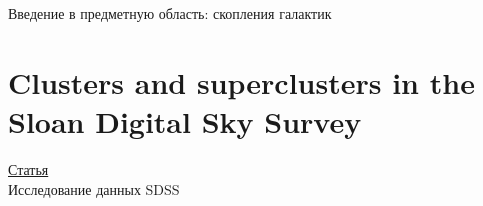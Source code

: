\documentclass{article}
\begin{document}
\begin{center}{\huge Введение в предметную область: скопления галактик\\}\end{center}

\section{Clusters and superclusters in the Sloan Digital Sky Survey}
\hyperlink{https://www.aanda.org/articles/aa/pdf/2003/26/aah4162.pdf}{Статья}\\

    Исследование данных SDSS 
\end{document}

